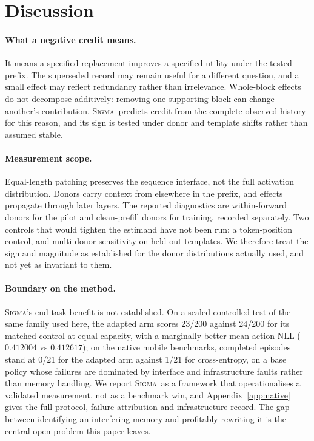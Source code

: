 \documentclass{article}
\newcommand{\method}{\textsc{Sigma}}
\begin{document}
\section{Discussion}
\label{sec:discussion}

\paragraph{What a negative credit means.} It means a specified replacement
improves a specified utility under the tested prefix. The superseded record may
remain useful for a different question, and a small effect may reflect
redundancy rather than irrelevance. Whole-block effects do not decompose
additively: removing one supporting block can change another's contribution.
\method\ predicts credit from the complete observed history for this reason, and
its sign is tested under donor and template shifts rather than assumed stable.

\paragraph{Measurement scope.} Equal-length patching preserves the sequence
interface, not the full activation distribution. Donors carry context from
elsewhere in the prefix, and effects propagate through later layers. The reported
diagnostics are within-forward donors for the pilot and clean-prefill donors for
training, recorded separately. Two controls that would tighten the estimand have
not been run: a token-position control, and multi-donor sensitivity on held-out
templates. We therefore treat the sign and magnitude as established for the
donor distributions actually used, and not yet as invariant to them.

\paragraph{Boundary on the method.} \method's end-task benefit is not
established. On a sealed controlled test of the same family used here, the
adapted arm scores 23/200 against 24/200 for its matched control at equal
capacity, with a marginally better mean action NLL ($0.412004$ vs $0.412617$);
on the native mobile benchmarks, completed episodes stand at 0/21 for the
adapted arm against 1/21 for cross-entropy, on a base policy whose failures are
dominated by interface and infrastructure faults rather than memory handling.
We report \method\ as a framework that operationalises a validated measurement,
not as a benchmark win, and Appendix~\ref{app:native} gives the full protocol,
failure attribution and infrastructure record. The gap between identifying an
interfering memory and profitably rewriting it is the central open problem this
paper leaves.
\end{document}
